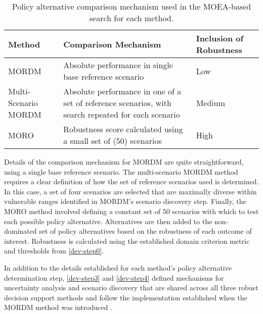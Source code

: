         \begin{table}[H]
            \centering
            \captionsetup{width=\textwidth}
            \caption{Policy alternative comparison mechanism used in the MOEA-based search for each method.}
            \label{table:conclusion-searchevaluation}
            
            \setlength\arrayrulewidth{1pt}
            \begin{tabularx}{\textwidth}{|l|X|l|}
                \rowcolor{tudelft-dark-blue!80}
                {\color{white} Method} &  {\color{white} Comparison Mechanism} & {\color{white} Inclusion of Robustness} \\ \hline
                
                MORDM & Absolute performance in single base reference scenario & Low \\ \hline
                Multi-Scenario MORDM & Absolute performance in one of a set of reference scenarios, with search repeated for each scenario & Medium \\ \hline
                MORO & Robustness score calculated using a small set of (50) scenarios & High \\ \hline
            \end{tabularx}
        \end{table}
        
        Details of the comparison mechanism for MORDM are quite straightforward, using a single base reference scenario. The multi-scenario MORDM method requires a clear definition of how the set of reference scenarios used is determined. In this case, a set of four scenarios are selected that are maximally diverse within vulnerable ranges identified in MORDM's scenario discovery step. Finally, the MORO method involved defining a constant set of 50 scenarios with which to test each possible policy alternative. Alternatives are then added to the non-dominated set of policy alternatives based on the robustness of each outcome of interest. Robustness is calculated using the established domain criterion metric and thresholds from \cref{dev-step0}. 
        
        In addition to the details established for each method's policy alternative determination step, \cref{dev-step3} and \cref{dev-step4} defined mechanisms for uncertainty analysis and scenario discovery that are shared across all three robust decision support methods and follow the implementation established when the MORDM method was introduced \citep{Kasprzyk2013}. 
        
